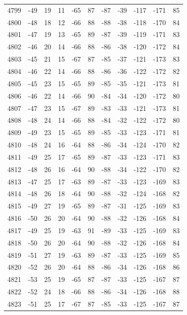 \begin{table}[H]
\begin{tabular}{lllllllllll}
4799 & -49 & 19 & 11 & -65 & 87 & -87 & -39 & -117 & -171 & 85 \\
4800 & -48 & 18 & 12 & -66 & 88 & -88 & -38 & -118 & -170 & 84 \\
4801 & -47 & 19 & 13 & -65 & 89 & -87 & -39 & -119 & -171 & 83 \\
4802 & -46 & 20 & 14 & -66 & 88 & -86 & -38 & -120 & -172 & 84 \\
4803 & -45 & 21 & 15 & -67 & 87 & -85 & -37 & -121 & -173 & 83 \\
4804 & -46 & 22 & 14 & -66 & 88 & -86 & -36 & -122 & -172 & 82 \\
4805 & -45 & 23 & 15 & -65 & 89 & -85 & -35 & -121 & -173 & 81 \\
4806 & -46 & 22 & 14 & -66 & 90 & -84 & -34 & -120 & -172 & 80 \\
4807 & -47 & 23 & 15 & -67 & 89 & -83 & -33 & -121 & -173 & 81 \\
4808 & -48 & 24 & 14 & -66 & 88 & -84 & -32 & -122 & -172 & 80 \\
4809 & -49 & 23 & 15 & -65 & 89 & -85 & -33 & -123 & -171 & 81 \\
4810 & -48 & 24 & 16 & -64 & 88 & -86 & -34 & -124 & -170 & 82 \\
4811 & -49 & 25 & 17 & -65 & 89 & -87 & -33 & -123 & -171 & 83 \\
4812 & -48 & 26 & 16 & -64 & 90 & -88 & -34 & -122 & -170 & 82 \\
4813 & -47 & 25 & 17 & -63 & 89 & -87 & -33 & -123 & -169 & 83 \\
4814 & -48 & 26 & 18 & -64 & 90 & -88 & -32 & -124 & -168 & 82 \\
4815 & -49 & 27 & 19 & -65 & 89 & -87 & -31 & -125 & -169 & 83 \\
4816 & -50 & 26 & 20 & -64 & 90 & -88 & -32 & -126 & -168 & 84 \\
4817 & -49 & 25 & 19 & -63 & 91 & -89 & -33 & -125 & -169 & 83 \\
4818 & -50 & 26 & 20 & -64 & 90 & -88 & -32 & -126 & -168 & 84 \\
4819 & -51 & 27 & 19 & -63 & 89 & -87 & -33 & -125 & -169 & 85 \\
4820 & -52 & 26 & 20 & -64 & 88 & -86 & -34 & -126 & -168 & 86 \\
4821 & -53 & 25 & 19 & -65 & 87 & -87 & -33 & -125 & -167 & 87 \\
4822 & -52 & 24 & 18 & -66 & 88 & -86 & -34 & -126 & -168 & 88 \\
4823 & -51 & 25 & 17 & -67 & 87 & -85 & -33 & -125 & -167 & 87 \\

\end{tabular}
\end{table}
